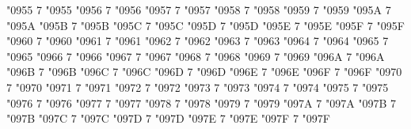 \Umathcode "0955 7 \symoperators "0955%
\Umathcode "0956 7 \symoperators "0956%
\Umathcode "0957 7 \symoperators "0957%
\Umathcode "0958 7 \symoperators "0958%
\Umathcode "0959 7 \symoperators "0959%
\Umathcode "095A 7 \symoperators "095A%
\Umathcode "095B 7 \symoperators "095B%
\Umathcode "095C 7 \symoperators "095C%
\Umathcode "095D 7 \symoperators "095D%
\Umathcode "095E 7 \symoperators "095E%
\Umathcode "095F 7 \symoperators "095F%
%
\Umathcode "0960 7 \symoperators "0960%
\Umathcode "0961 7 \symoperators "0961%
\Umathcode "0962 7 \symoperators "0962%
\Umathcode "0963 7 \symoperators "0963%
\Umathcode "0964 7 \symoperators "0964%
\Umathcode "0965 7 \symoperators "0965%
\Umathcode "0966 7 \symoperators "0966%
\Umathcode "0967 7 \symoperators "0967%
\Umathcode "0968 7 \symoperators "0968%
\Umathcode "0969 7 \symoperators "0969%
\Umathcode "096A 7 \symoperators "096A%
\Umathcode "096B 7 \symoperators "096B%
\Umathcode "096C 7 \symoperators "096C%
\Umathcode "096D 7 \symoperators "096D%
\Umathcode "096E 7 \symoperators "096E%
\Umathcode "096F 7 \symoperators "096F%
%
\Umathcode "0970 7 \symoperators "0970%
\Umathcode "0971 7 \symoperators "0971%
\Umathcode "0972 7 \symoperators "0972%
\Umathcode "0973 7 \symoperators "0973%
\Umathcode "0974 7 \symoperators "0974%
\Umathcode "0975 7 \symoperators "0975%
\Umathcode "0976 7 \symoperators "0976%
\Umathcode "0977 7 \symoperators "0977%
\Umathcode "0978 7 \symoperators "0978%
\Umathcode "0979 7 \symoperators "0979%
\Umathcode "097A 7 \symoperators "097A%
\Umathcode "097B 7 \symoperators "097B%
\Umathcode "097C 7 \symoperators "097C%
\Umathcode "097D 7 \symoperators "097D%
\Umathcode "097E 7 \symoperators "097E%
\Umathcode "097F 7 \symoperators "097F%


